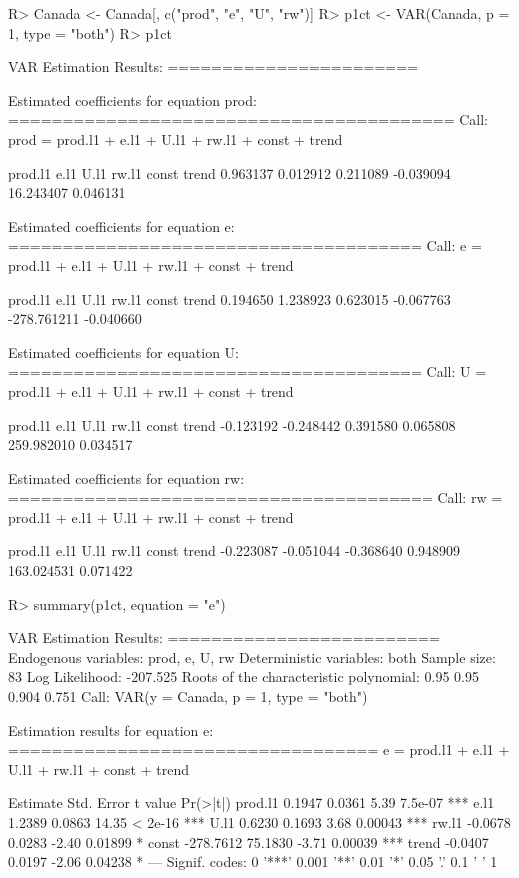\documentclass[nojss]{jss}
\begin{document}
\begin{Schunk}
\begin{Sinput}
R> Canada <- Canada[, c("prod", "e", "U", "rw")]
R> p1ct <- VAR(Canada, p = 1, type = "both")
R> p1ct
\end{Sinput}
\begin{Soutput}
VAR Estimation Results:
======================= 

Estimated coefficients for equation prod: 
========================================= 
Call:
prod = prod.l1 + e.l1 + U.l1 + rw.l1 + const + trend 

  prod.l1      e.l1      U.l1     rw.l1     const     trend 
 0.963137  0.012912  0.211089 -0.039094 16.243407  0.046131 


Estimated coefficients for equation e: 
====================================== 
Call:
e = prod.l1 + e.l1 + U.l1 + rw.l1 + const + trend 

    prod.l1        e.l1        U.l1       rw.l1       const       trend 
   0.194650    1.238923    0.623015   -0.067763 -278.761211   -0.040660 


Estimated coefficients for equation U: 
====================================== 
Call:
U = prod.l1 + e.l1 + U.l1 + rw.l1 + const + trend 

   prod.l1       e.l1       U.l1      rw.l1      const      trend 
 -0.123192  -0.248442   0.391580   0.065808 259.982010   0.034517 


Estimated coefficients for equation rw: 
======================================= 
Call:
rw = prod.l1 + e.l1 + U.l1 + rw.l1 + const + trend 

   prod.l1       e.l1       U.l1      rw.l1      const      trend 
 -0.223087  -0.051044  -0.368640   0.948909 163.024531   0.071422 
\end{Soutput}
\begin{Sinput}
R> summary(p1ct, equation = "e")
\end{Sinput}
\begin{Soutput}
VAR Estimation Results:
========================= 
Endogenous variables: prod, e, U, rw 
Deterministic variables: both 
Sample size: 83 
Log Likelihood: -207.525 
Roots of the characteristic polynomial:
0.95 0.95 0.904 0.751
Call:
VAR(y = Canada, p = 1, type = "both")


Estimation results for equation e: 
================================== 
e = prod.l1 + e.l1 + U.l1 + rw.l1 + const + trend 

         Estimate Std. Error t value Pr(>|t|)    
prod.l1    0.1947     0.0361    5.39  7.5e-07 ***
e.l1       1.2389     0.0863   14.35  < 2e-16 ***
U.l1       0.6230     0.1693    3.68  0.00043 ***
rw.l1     -0.0678     0.0283   -2.40  0.01899 *  
const   -278.7612    75.1830   -3.71  0.00039 ***
trend     -0.0407     0.0197   -2.06  0.04238 *  
---
Signif. codes:  0 '***' 0.001 '**' 0.01 '*' 0.05 '.' 0.1 ' ' 1 



\end{Soutput}
\end{Schunk}
\end{document}
